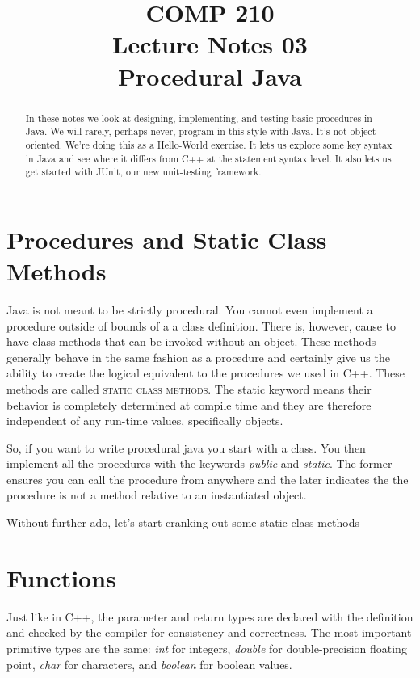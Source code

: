 \documentclass[]{tufte-handout}
\title{COMP 210 \\ Lecture Notes 03 \\ Procedural Java}
\begin{document}
\maketitle

\begin{abstract}
In these notes we look at designing, implementing, and testing basic procedures in Java. We will rarely, perhaps never, program in this style with Java. It's not object-oriented. We're doing this as a Hello-World exercise. It lets us explore some key syntax in Java and see where it differs from C++ at the statement syntax level. It also lets us get started with JUnit, our new unit-testing framework.
\end{abstract}

\section{Procedures and Static Class Methods}

Java is not meant to be strictly procedural. You cannot even implement a procedure outside of bounds of a a class definition. There is, however, cause to have class methods that can be invoked without an object. These methods generally behave in the same fashion as a procedure and certainly give us the ability to create the logical equivalent to the procedures we used in C++. These methods are called \textsc{static class methods}. The static keyword means their behavior is completely determined at compile time and they are therefore independent of any run-time values, specifically objects.

So, if you want to write procedural java you start with a class. You then implement all the procedures with the keywords \textit{public} and \textit{static}. The former ensures you can call the procedure from anywhere and the later indicates the the procedure is not a method relative to an instantiated object.

Without further ado, let's start cranking out some static class methods

\section{Functions}

Just like in C++, the parameter and return types are declared with the definition and checked by the compiler for consistency and correctness. The most important primitive types are the same: \textit{int} for integers, \textit{double} for double-precision floating point, \textit{char} for characters, and \textit{boolean} for boolean values.
\end{document}
